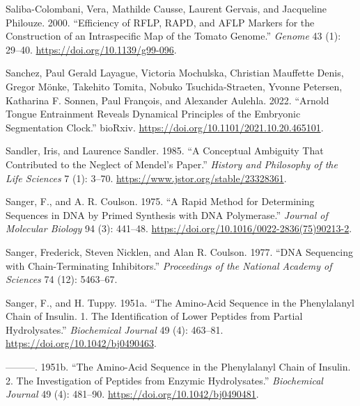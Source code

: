 \documentclass[
]{book}
\newlength{\cslhangindent}
\newlength{\cslentryspacingunit} %
\newenvironment{CSLReferences}[2] %
 {%
  \setlength{\parindent}{0pt}
  \ifodd #1
  \let\oldpar\par
  \def\par{\hangindent=\cslhangindent\oldpar}
  \fi
  \setlength{\parskip}{#2\cslentryspacingunit}
 }%
 {}
\begin{document}
\begin{CSLReferences}{1}{0}
\leavevmode{}%
Saliba-Colombani, Vera, Mathilde Causse, Laurent Gervais, and Jacqueline Philouze. 2000. {``Efficiency of {RFLP}, {RAPD}, and {AFLP} Markers for the Construction of an Intraspecific Map of the Tomato Genome.''} \emph{Genome} 43 (1): 29--40. \url{https://doi.org/10.1139/g99-096}.

\leavevmode{}%
Sanchez, Paul Gerald Layague, Victoria Mochulska, Christian Mauffette Denis, Gregor Mönke, Takehito Tomita, Nobuko Tsuchida-Straeten, Yvonne Petersen, Katharina F. Sonnen, Paul François, and Alexander Aulehla. 2022. {``Arnold Tongue Entrainment Reveals Dynamical Principles of the Embryonic Segmentation Clock.''} {bioRxiv}. \url{https://doi.org/10.1101/2021.10.20.465101}.

\leavevmode{}%
Sandler, Iris, and Laurence Sandler. 1985. {``A {Conceptual Ambiguity} That {Contributed} to the {Neglect} of {Mendel}'s {Paper}.''} \emph{History and Philosophy of the Life Sciences} 7 (1): 3--70. \url{https://www.jstor.org/stable/23328361}.

\leavevmode{}%
Sanger, F., and A. R. Coulson. 1975. {``A Rapid Method for Determining Sequences in {DNA} by Primed Synthesis with {DNA} Polymerase.''} \emph{Journal of Molecular Biology} 94 (3): 441--48. \url{https://doi.org/10.1016/0022-2836(75)90213-2}.

\leavevmode{}%
Sanger, Frederick, Steven Nicklen, and Alan R. Coulson. 1977. {``{DNA} Sequencing with Chain-Terminating Inhibitors.''} \emph{Proceedings of the National Academy of Sciences} 74 (12): 5463--67.

\leavevmode{}%
Sanger, F., and H. Tuppy. 1951a. {``The Amino-Acid Sequence in the Phenylalanyl Chain of Insulin. 1. {The} Identification of Lower Peptides from Partial Hydrolysates.''} \emph{Biochemical Journal} 49 (4): 463--81. \url{https://doi.org/10.1042/bj0490463}.

\leavevmode{}%
---------. 1951b. {``The Amino-Acid Sequence in the Phenylalanyl Chain of Insulin. 2. {The} Investigation of Peptides from Enzymic Hydrolysates.''} \emph{Biochemical Journal} 49 (4): 481--90. \url{https://doi.org/10.1042/bj0490481}.


\end{CSLReferences}
\end{document}
